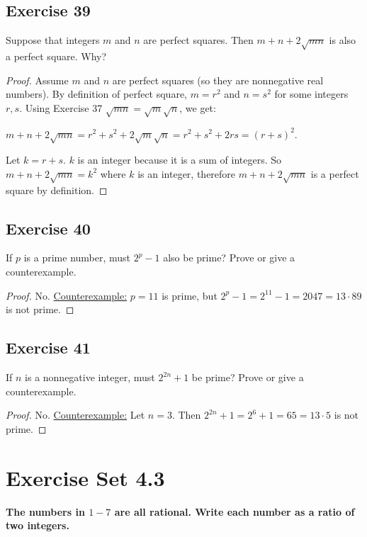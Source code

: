 \documentclass[14pt]{extarticle}
\newcommand{\cy}{\color{cyan}}
\begin{document}
\subsection{Exercise 39}
Suppose that integers $m$ and $n$ are perfect squares. Then $m + n + 2\sqrt{mn}$ is also a perfect square. Why?

\begin{proof}
    Assume $m$ and $n$ are perfect squares (so they are nonnegative real numbers). By definition of perfect square, $m = r^2$ and $n = s^2$ for some integers $r, s$. Using Exercise 37 $\sqrt{mn} = \sqrt{m}\sqrt{n}$, we get:

    $m + n + 2\sqrt{mn} = r^2 + s^2 + 2\sqrt{m}\sqrt{n} = r^2 + s^2 + 2rs = (r+s)^2$.

    Let $k = r+s$. $k$ is an integer because it is a sum of integers. So $m + n + 2\sqrt{mn} = k^2$ where $k$ is an integer, therefore $m + n + 2\sqrt{mn}$ is a perfect square by definition.

\end{proof}

\subsection{Exercise 40}
If $p$ is a prime number, must $2^p - 1$ also be prime? Prove or give a counterexample.

\begin{proof}
    No. \underline{Counterexample:} $p = 11$ is prime, but $2^p - 1 = 2^{11} - 1 = 2047 = 13 \cdot 89$ is not prime.
\end{proof}

\subsection{Exercise 41}
If $n$ is a nonnegative integer, must $2^{2n} + 1$ be prime? Prove or give a counterexample.

\begin{proof}
    No. \underline{Counterexample:} Let $n = 3$. Then $2^{2n} + 1 = 2^{6} + 1 = 65 = 13 \cdot 5$ is not prime.
\end{proof}

\section{Exercise Set 4.3}

 {\bf \cy The numbers in $1-7$ are all rational. Write each number as a ratio of two integers.}
\end{document}
